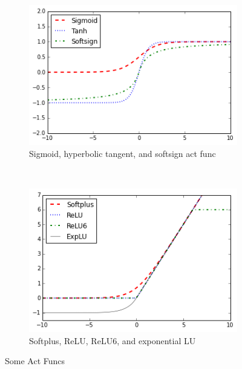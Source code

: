 \documentclass{article}
\begin{document}
\begin{figure}[H]
    \centering
    \begin{subfigure}[b]{0.4\textwidth}
        \includegraphics[width=\textwidth]{images/d2167d3b-96f9-46d1-87c4-79d0839b3745.png}
        \caption{Sigmoid, hyperbolic tangent, and softsign act func}
    \end{subfigure}
    \qquad
    ~ %
    \begin{subfigure}[b]{0.4\textwidth}
        \includegraphics[width=\textwidth]{images/2a1256eb-1993-4e62-a561-48577ebcfec2.png}
        \caption{Softplus, ReLU, ReLU6, and exponential LU}
    \end{subfigure}
    \caption{Some Act Funcs}
\end{figure}
\end{document}
